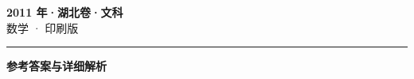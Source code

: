 \documentclass[zihao=5, a4paper]{ctexart}
\begin{document}
\begin{center}
  {\Large\bfseries 2011 年·湖北卷·文科}\\[4pt]
  {\large 数学 · 印刷版}
\end{center}
\medskip
{}

\par\bigskip\hrule\bigskip
{}
\begin{center}{\large\bfseries 参考答案与详细解析}\end{center}
\smallskip

\end{document}
